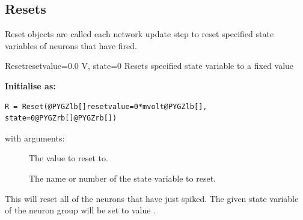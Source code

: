 \documentclass[letterpaper,10pt,english]{manual}
\begin{document}
\subsection{Resets}

Reset objects are called each network update step to reset
specified state variables of neurons that have fired.

\hypertarget{brian.Reset}{}\begin{classdesc}{Reset}{resetvalue=0.0 V, state=0}
Resets specified state variable to a fixed value

\textbf{Initialise as:}

\begin{Verbatim}[commandchars=@\[\]]
R = Reset(@PYGZlb[]resetvalue=0*mvolt@PYGZlb[], state=0@PYGZrb[]@PYGZrb[])
\end{Verbatim}

with arguments:
\begin{description}
\item[] \leavevmode
The value to reset to.

\item[] \leavevmode
The name or number of the state variable to reset.

\end{description}

This will reset all of the neurons that have just spiked. The
given state variable of the neuron group will be set to value
.
\end{classdesc}
\end{document}
